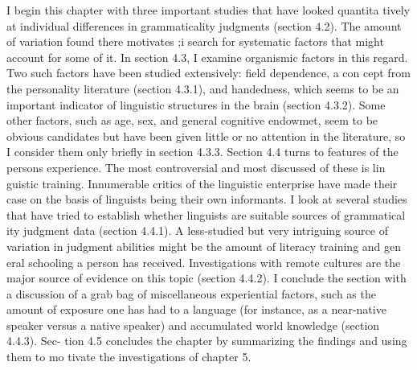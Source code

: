 \clearpage\setcounter{page}{1}\begin{styleStandard}
I begin this chapter with three important studies that have looked quantita\- tively at individual differences in grammaticality judgments (section 4.2). The amount of variation found there motivates ;i search for systematic factors that might account for some of it. In section 4.3, I examine organismic factors in this regard. Two such factors have been studied extensively: field dependence, a con\- cept from the personality literature (section 4.3.1), and handedness, which seems to be an important indicator of linguistic structures in the brain (section 4.3.2). Some other factors, such as age, sex, and general cognitive endowmet, seem to be obvious candidates but have been given little or no attention in the literature, so I consider them only briefly in section 4.3.3. Section 4.4 turns to features of the person{\textquotesingle}s experience. The most controversial and most discussed of these is lin\- guistic training. Innumerable critics of the linguistic enterprise have made their case on the basis of linguists being their own informants. I look at several studies that have tried to establish whether linguists are suitable sources of grammatical\- ity judgment data (section 4.4.1). A less-studied but very intriguing source of variation in judgment abilities might be the amount of literacy training and gen\- eral schooling a person has received. Investigations with remote cultures are the major source of evidence on this topic (section 4.4.2). I conclude the section with a discussion of a grab bag of miscellaneous experiential factors, such as the amount of exposure one has had to a language (for instance, as a near-native speaker versus a native speaker) and accumulated world knowledge (section 4.4.3). Sec-{\textquotesingle} tion 4.5 concludes the chapter by summarizing the findings and using them to mo\- tivate the investigations of chapter 5.
\end{styleStandard}


